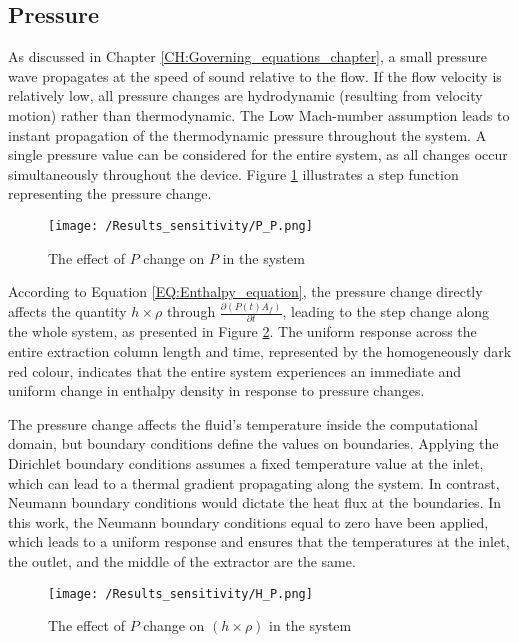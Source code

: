 \documentclass[../Article_Sensitivity_Analsysis.tex]{subfiles}
\begin{document}
	
	\subsection{Pressure}
	
	As discussed in Chapter \ref{CH:Governing_equations_chapter}, a small pressure wave propagates at the speed of sound relative to the flow. If the flow velocity is relatively low, all pressure changes are hydrodynamic (resulting from velocity motion) rather than thermodynamic. The Low Mach-number assumption leads to instant propagation of the thermodynamic pressure throughout the system. A single pressure value can be considered for the entire system, as all changes occur simultaneously throughout the device. Figure \ref{fig:Sensitivty_P_P} illustrates a step function representing the pressure change.
	
	\begin{figure}[h!]
		\centering
		\texttt{[image: /Results\_sensitivity/P\_P.png]}
		\caption{The effect of $P$ change on $P$ in the system}
		\label{fig:Sensitivty_P_P}
	\end{figure}
	
	
	According to Equation \ref{EQ:Enthalpy_equation}, the pressure change directly affects the quantity $h \times \rho$ through $\frac{\partial (P(t) A_f)}{\partial t}$, leading to the step change along the whole system, as presented in Figure \ref{fig:Sensitivty_P_H}. The uniform response across the entire extraction column length and time, represented by the homogeneously dark red colour, indicates that the entire system experiences an immediate and uniform change in enthalpy density in response to pressure changes. 
	
	The pressure change affects the fluid's temperature inside the computational domain, but boundary conditions define the values on boundaries. Applying the Dirichlet boundary conditions assumes a fixed temperature value at the inlet, which can lead to a thermal gradient propagating along the system. In contrast, Neumann boundary conditions would dictate the heat flux at the boundaries. In this work, the Neumann boundary conditions equal to zero have been applied, which leads to a uniform response and ensures that the temperatures at the inlet, the outlet, and the middle of the extractor are the same.
	
	\begin{figure}[h!]
		\centering
		\texttt{[image: /Results\_sensitivity/H\_P.png]}
		\caption{The effect of $P$ change on $(h \times \rho)$ in the system}
		\label{fig:Sensitivty_P_H}
	\end{figure}
	
\end{document}
